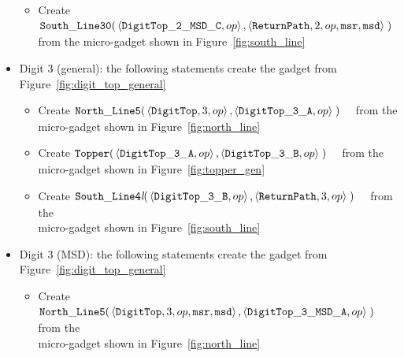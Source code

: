 \begin{itemize}
\begin{itemize}
            \item Create
            $\begin{aligned}[t]
                {\tt South\_Line30}(& \left\langle {\tt DigitTop\_2\_MSD\_C}, op                      \right\rangle,
                                      \left\langle {\tt ReturnPath}, 2,            op, {\tt msr}, {\tt msd}\right\rangle \;)
            \end{aligned}$ from the micro-gadget shown in Figure~\ref{fig:south_line}
        \end{itemize}
        \vspace{1cm}


        \item Digit 3 (general): the following statements create the gadget from Figure~\ref{fig:digit_top_general}
        \begin{itemize}
            \item Create
            $\begin{aligned}[t]
                {\tt North\_Line5}(& \left\langle {\tt DigitTop}, 3,    op \right\rangle,
                                     \left\langle {\tt DigitTop\_3\_A}, op \right\rangle \;)
            \end{aligned}$ from the micro-gadget shown in Figure~\ref{fig:north_line}

            \item Create
            $\begin{aligned}[t]
                {\tt Topper}(& \left\langle {\tt DigitTop\_3\_A}, op \right\rangle,
                               \left\langle {\tt DigitTop\_3\_B}, op \right\rangle \;)
            \end{aligned}$ from the micro-gadget shown in Figure~\ref{fig:topper_gen}

            \item Create
            $\begin{aligned}[t]
                {\tt South\_Line4\textit{l}}(& \left\langle {\tt DigitTop\_3\_B}, op \right\rangle,
                                               \left\langle {\tt ReturnPath}, 3,       op \right\rangle \;)
            \end{aligned}$ from the\\micro-gadget shown in Figure~\ref{fig:south_line}
        \end{itemize}
        \vspace{1cm}


        \item Digit 3 (MSD): the following statements create the gadget from Figure~\ref{fig:digit_top_general}
        \begin{itemize}
            \item Create
            $\begin{aligned}[t]
                {\tt North\_Line5}(& \left\langle {\tt DigitTop}, 3,         op, {\tt msr}, {\tt msd} \right\rangle,
                                     \left\langle {\tt DigitTop\_3\_MSD\_A}, op                       \right\rangle \;)
            \end{aligned}$ from the\\micro-gadget shown in Figure~\ref{fig:north_line}


\end{itemize}
\end{itemize}
